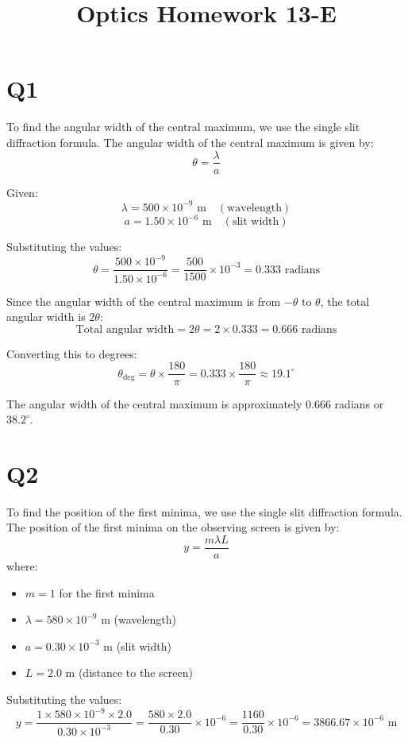 \documentclass{article}
\begin{document}
\title{Optics Homework 13-E}
\author{}
\date{}
\maketitle


\section{Q1}
To find the angular width of the central maximum, we use the single slit diffraction formula. The angular width of the central maximum is given by:
\[
\theta = \frac{\lambda}{a}
\]

Given:
\[
\lambda = 500 \times 10^{-9} \text{ m} \quad (\text{wavelength})
\]
\[
a = 1.50 \times 10^{-6} \text{ m} \quad (\text{slit width})
\]

Substituting the values:
\[
\theta = \frac{500 \times 10^{-9}}{1.50 \times 10^{-6}} = \frac{500}{1500} \times 10^{-3} = 0.333 \text{ radians}
\]

Since the angular width of the central maximum is from \(-\theta\) to \(\theta\), the total angular width is \(2\theta\):
\[
\text{Total angular width} = 2 \theta = 2 \times 0.333 = 0.666 \text{ radians}
\]

Converting this to degrees:
\[
\theta_{\text{deg}} = \theta \times \frac{180}{\pi} = 0.333 \times \frac{180}{\pi} \approx 19.1^\circ
\]

The angular width of the central maximum is approximately \(0.666\) radians or \(38.2^\circ\).

\section{Q2}
To find the position of the first minima, we use the single slit diffraction formula. The position of the first minima on the observing screen is given by:
\[
y = \frac{m \lambda L}{a}
\]
where:
\begin{itemize}
    \item \( m = 1 \) for the first minima
    \item \( \lambda = 580 \times 10^{-9} \text{ m} \) (wavelength)
    \item \( a = 0.30 \times 10^{-3} \text{ m} \) (slit width)
    \item \( L = 2.0 \text{ m} \) (distance to the screen)
\end{itemize}

Substituting the values:
\[
y = \frac{1 \times 580 \times 10^{-9} \times 2.0}{0.30 \times 10^{-3}} = \frac{580 \times 2.0}{0.30} \times 10^{-6} = \frac{1160}{0.30} \times 10^{-6} = 3866.67 \times 10^{-6} \text{ m}
\]
\end{document}
